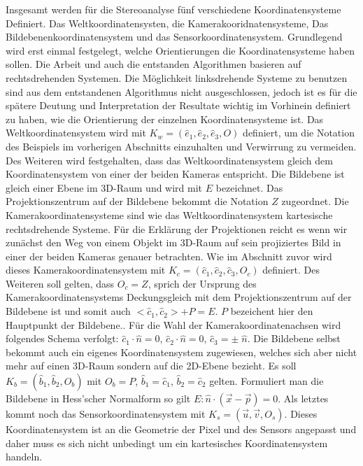 Insgesamt werden für die Stereoanalyse fünf verschiedene Koordinatensysteme Definiert. Das Weltkoordinatensysten, die Kamerakooridnatensysteme, Das Bildebenenkoordinatensystem und das Sensorkoordinatensystem. Grundlegend wird erst einmal festgelegt, welche Orientierungen die Koordinatensysteme haben sollen. Die Arbeit und auch die entstanden Algorithmen basieren auf rechtsdrehenden Systemen. Die Möglichkeit linksdrehende Systeme zu benutzen sind aus dem entstandenen Algorithmus nicht ausgeschlossen, jedoch ist es für die spätere Deutung und Interpretation der Resultate wichtig im Vorhinein definiert zu haben, wie die Orientierung der einzelnen Koordinatensysteme ist. Das Weltkoordinatensystem wird mit \ensuremath{K_w=(\hat{e}_1,\hat{e}_2,\hat{e}_3,O )} definiert, um die Notation des Beispiels im vorherigen Abschnitts einzuhalten und Verwirrung zu vermeiden. Des Weiteren wird festgehalten, dass das Weltkoordinatensystem gleich dem Koordinatensystem von einer der beiden Kameras entspricht. Die Bildebene ist gleich einer Ebene im 3D-Raum und wird mit \ensuremath{E} bezeichnet. Das Projektionszentrum auf der Bildebene bekommt die Notation \ensuremath{Z} zugeordnet. Die Kamerakoordinatensysteme sind wie das Weltkoordinatensystem kartesische rechtsdrehende Systeme. Für die Erklärung der Projektionen reicht es wenn wir zunächst den Weg von einem Objekt im 3D-Raum auf sein projiziertes Bild in einer der beiden Kameras genauer betrachten. Wie im Abschnitt zuvor wird dieses Kamerakoordinatensystem mit \ensuremath{K_c= (\hat{c}_1,\hat{c}_2,\hat{c}_3,O_c)} definiert. Des Weiteren soll gelten, dass \ensuremath{O_c = Z}, sprich der Ursprung des Kamerakoordinatensystems Deckungsgleich mit dem Projektionszentrum auf der Bildebene ist und somit auch \ensuremath{ <\hat{c}_1,\hat{c}_2> + P = E}. \ensuremath{P} bezeichent hier den Hauptpunkt der Bildebene.. Für die Wahl der Kamerakoordinatenachsen wird folgendes Schema verfolgt: \ensuremath{\hat{c}_1 \cdot \hat{n} = 0}, \ensuremath{\hat{c}_2 \cdot \hat{n} = 0}, \ensuremath{\hat{c}_3  = \pm\;\hat{n}}.  Die Bildebene selbst bekommt auch ein eigenes Koordinatensystem zugewiesen, welches sich aber nicht mehr auf einen 3D-Raum sondern auf die 2D-Ebene bezieht. Es soll \ensuremath{K_b = (\hat{b}_1,\hat{b}_2,O_b)} mit \ensuremath{O_b = P}, \ensuremath{\hat{b}_1 = \hat{c}_1}, \ensuremath{\hat{b}_2 = \hat{c}_2} gelten.  Formuliert man die Bildebene in Hess'scher Normalform so gilt \ensuremath{E: \hat{n} \cdot (\vec{x} - \vec{p}) = 0}. Als letztes kommt noch das Sensorkoordinatensystem mit  \ensuremath{K_s = (\vec{u}, \vec{v}, O_s)}. Dieses Koordinatensystem ist an die Geometrie der Pixel und des Sensors angepasst und daher muss es sich nicht unbedingt um ein kartesisches Koordinatensystem handeln.\\

